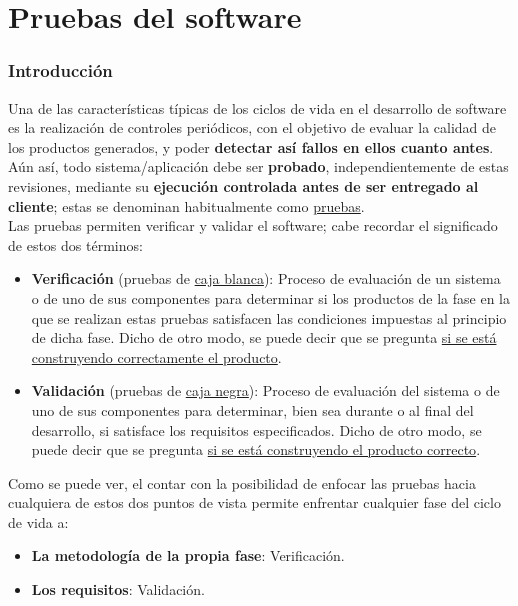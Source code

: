 \part{Pruebas del software}

\section{Introducción}

Una de las características típicas de los ciclos de vida en el desarrollo de software es la realización de controles periódicos, con el objetivo de evaluar la calidad de los productos generados, y poder \textbf{detectar así fallos en ellos cuanto antes}. Aún así, todo sistema/aplicación debe ser \textbf{probado}, independientemente de estas revisiones, mediante su \textbf{ejecución controlada antes de ser entregado al cliente}; estas se denominan habitualmente como \uline{pruebas}.\\

Las pruebas permiten verificar y validar el software; cabe recordar el significado de estos dos términos:

\begin{itemize}
    \item \textbf{Verificación} (pruebas de \uline{caja blanca}): Proceso de evaluación de un sistema o de uno de sus componentes para determinar si los productos de la fase en la que se realizan estas pruebas satisfacen las condiciones impuestas al principio de dicha fase. Dicho de otro modo, se puede decir que se pregunta \uline{si se está construyendo correctamente el producto}.
    
    \item \textbf{Validación} (pruebas de \uline{caja negra}): Proceso de evaluación del sistema o de uno de sus componentes para determinar, bien sea durante o al final del desarrollo, si satisface los requisitos especificados. Dicho de otro modo, se puede decir que se pregunta \uline{si se está construyendo el producto correcto}.
\end{itemize}

Como se puede ver, el contar con la posibilidad de enfocar las pruebas hacia cualquiera de estos dos puntos de vista permite enfrentar cualquier fase del ciclo de vida a:

\begin{itemize}
    \item \textbf{La metodología de la propia fase}: Verificación.
    \item \textbf{Los requisitos}: Validación.
\end{itemize}

